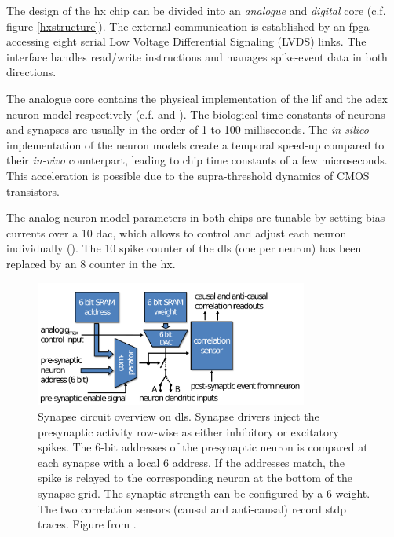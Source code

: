 The design of the \gls{hx} chip can be divided into an \emph{analogue} and \emph{digital} core (c.f. figure \ref{hxstructure}). The external communication is established by an \gls{fpga} accessing eight serial Low Voltage Differential Signaling (LVDS) links. The interface handles read/write instructions and manages spike-event data in both directions.

The analogue core contains the physical implementation of the \gls{lif} and the \gls{adex} neuron model respectively (c.f. \citealp{aamir2018dls2neuron} and \citealp{aamir2018mixed}). The biological time constants of neurons and synapses are usually in the order of 1 to 100 milliseconds. The \textit{in-silico} implementation of the neuron models create a temporal speed-up compared to their \textit{in-vivo} counterpart, leading to chip time constants of a few microseconds. This acceleration is possible due to the supra-threshold dynamics of CMOS transistors. 

The analog neuron model parameters in both chips are tunable by setting bias currents over a \SI{10}{\bit} \gls{dac}, which allows to control and adjust each neuron individually (\citealp{hock13analogmemory}). The \SI{10}{\bit} spike counter of the \gls{dls} (one per neuron) has been replaced by an \SI{8}{\bit} counter in the \gls{hx}. 

\begin{figure}
	\centering
	\includegraphics[width=0.8\textwidth]{figures/synapse.png}
	\caption[Synapse circuit overview on \gls{dls}]{Synapse circuit overview on \gls{dls}. Synapse drivers inject the presynaptic activity row-wise as either inhibitory or excitatory spikes. The 6-bit addresses of the presynaptic neuron is compared at each synapse with a local \SI{6}{\bit} address. If the addresses match, the spike is relayed to the corresponding neuron at the bottom of the synapse grid. The synaptic strength can be configured by a \SI{6}{\bit} weight. The two correlation sensors (causal and anti-causal) record \gls{stdp} traces. Figure from \citealp{friedmann2016hybridlearning}.}
	\label{synapseschematics}
\end{figure}

